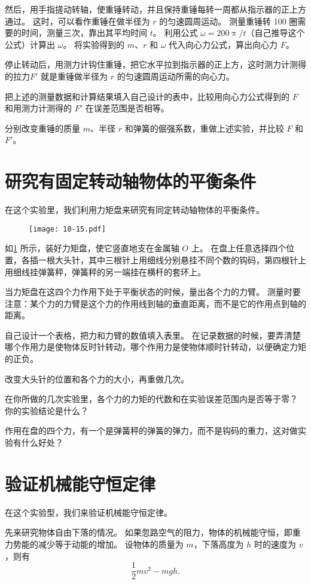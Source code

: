然后，用手指搓动转轴，使重锤转动，并且保持重锤每转一周都从指示器的正上方通过。
这时，可以看作重锤在做半径为 $r$ 的匀速圆周运动。
测量重锤转 100 圈需要的时间，测量三次，靠出其平均时间 $t$。
利用公式 $\omega=200\uppi/t$（自己推导这个公式）计算出 $\omega$。
将实验得到的 $m$、$r$ 和 $\omega$ 代入向心力公式，算出向心力 $F$。

停止转动后，用测力计钩住重锤，把它水平拉到指示器的正上方，这时测力计测得的拉力$F'$ 就是重锤做半径为 $r$ 的匀速圆周运动所需的向心力。

把上述的测量数据和计算结果填入自己设计的表中，比较用向心力公式得到的 $F$ 和用测力计测得的 $F'$ 在误差范围是否相等。

分别改变重锤的质量 $m$、半径 $r$ 和弹簧的倔强系数，重做上述实验，并比较 $F$ 和 $F'$。

\section{研究有固定转动轴物体的平衡条件}
在这个实验里，我们利用力矩盘来研究有同定转动轴物体的平衡条件。
\begin{figure}
  \texttt{[image: 10-15.pdf]}
  \caption{}\label{fig:10-15}
\end{figure}

如\cref{fig:10-15} 所示，装好力矩盘，使它竖直地支在金属轴 $O$ 上。
在盘上任意选择四个位置，各插一根大头针，其中三根针上用细线分别悬挂不同个数的钩码，第四根针上用细线挂弹簧秤，弹簧秤的另一端挂在横杆的套环上。

当力矩盘在这四个力作用下处于平衡状态的时候，量出各个力的力臂。
测量时要注意：某个力的力臂是这个力的作用线到轴的垂直距离，而不是它的作用点到轴的距离。

自己设计一个表格，把力和力臂的数值填入表里。
在记录数据的时候，要弄清楚哪个作用力是使物体反时针转动，哪个作用力是使物体顺时针转动，以便确定力矩的正负。

改变大头针的位置和各个力的大小，再重做几次。

在你所做的几次实验里，各个力的力矩的代数和在实验误差范围内是否等于零？
你的实验结论是什么？

作用在盘的四个力，有一个是弹簧秤的弹簧的弹力，而不是钩码的重力，这对做实验有什么好处？

\section{验证机械能守恒定律}
在这个实验型，我们来验证机械能守恒定律。

先来研究物体自由下落的情况。
如果忽路空气的阻力，物体的机械能守恒，即重力势能的减少等于动能的增加。
设物体的质量为 $m$，下落高度为 $h$ 时的速度为 $v$，则有
\[\frac{1}{2}mv^2-mgh.\]

